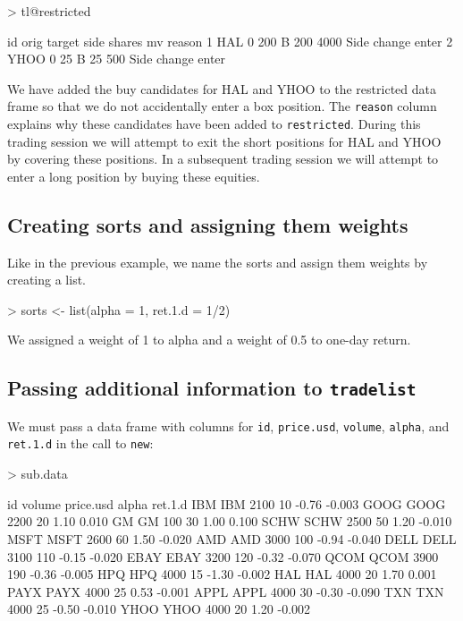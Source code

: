 \documentclass{article}
\begin{document}
\begin{Schunk}
\begin{Sinput}
> tl@restricted
\end{Sinput}
\begin{Soutput}
    id orig target side shares   mv            reason
1  HAL    0    200    B    200 4000 Side change enter
2 YHOO    0     25    B     25  500 Side change enter
\end{Soutput}
\end{Schunk}

We have added the buy candidates for HAL and YHOO to the restricted
data frame so that we do not accidentally enter a box position.  The
\texttt{reason} column explains why these candidates have been added
to \texttt{restricted}.  During this trading session we will attempt
to exit the short positions for HAL and YHOO by covering these
positions.  In a subsequent trading session we will attempt to enter a
long position by buying these equities.

\subsection{Creating sorts and assigning them weights}

Like in the previous example, we name the sorts and assign them
weights by creating a list.

\begin{Schunk}
\begin{Sinput}
> sorts <- list(alpha = 1, ret.1.d = 1/2)
\end{Sinput}
\end{Schunk}

We assigned a weight of 1 to alpha and a weight
of 0.5 to one-day return.

\subsection{Passing additional information to \texttt{tradelist}}

We must pass a data frame with columns for \texttt{id},
\texttt{price.usd}, \texttt{volume}, \texttt{alpha}, and
\texttt{ret.1.d} in the call to \texttt{new}:


\begin{Schunk}
\begin{Sinput}
> sub.data
\end{Sinput}
\begin{Soutput}
       id volume price.usd alpha ret.1.d
IBM   IBM   2100        10 -0.76  -0.003
GOOG GOOG   2200        20  1.10   0.010
GM     GM    100        30  1.00   0.100
SCHW SCHW   2500        50  1.20  -0.010
MSFT MSFT   2600        60  1.50  -0.020
AMD   AMD   3000       100 -0.94  -0.040
DELL DELL   3100       110 -0.15  -0.020
EBAY EBAY   3200       120 -0.32  -0.070
QCOM QCOM   3900       190 -0.36  -0.005
HPQ   HPQ   4000        15 -1.30  -0.002
HAL   HAL   4000        20  1.70   0.001
PAYX PAYX   4000        25  0.53  -0.001
APPL APPL   4000        30 -0.30  -0.090
TXN   TXN   4000        25 -0.50  -0.010
YHOO YHOO   4000        20  1.20  -0.002
\end{Soutput}
\end{Schunk}
\end{document}
